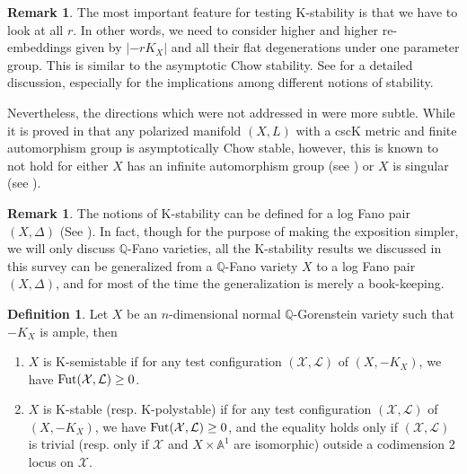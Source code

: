 \documentclass[12pt,reqno]{amsart}%
\newcommand{\cX}{{\mathcal{X}}}
\newcommand{\cL}{{\mathcal{L}}}
\theoremstyle{definition}
\newtheorem{defn}[thm]{Definition}
\newtheorem{rem}[thm]{Remark}
\theoremstyle{remark}
\newcommand{\Fut}{{\rm Fut}}
\newcommand{\bQ}{{\mathbb{Q}}}
\begin{document}
\begin{rem}\label{r-GITvsK}
The most important feature for testing K-stability is that we have to look at all  $r$. In other words, we need to consider higher and higher re-embeddings given by $|-rK_X|$ and all their flat degenerations under  one parameter group.   This is similar to the asymptotic Chow stability. See \cite[Section 3]{RT07} for a detailed discussion, especially for the implications among different notions of stability. 

Nevertheless, the directions which were not addressed in \cite{RT07} were more subtle. While it is proved in \cite{Don02} that any polarized manifold $(X,L)$ with a cscK metric and finite automorphism group is asymptotically Chow stable, however, this is known to not hold for either $X$ has an infinite automorphism group (see \cite{OSY12}) or $X$ is singular (see \cite{Oda12}). 
\end{rem} 

\begin{rem}The notions of K-stability can be defined for a log Fano pair $(X,\Delta)$ (See \cite[(30)]{Don12}). In fact, though for the purpose of making the exposition simpler, we will only discuss $\bQ$-Fano varieties, all the K-stability results we discussed in this survey can be generalized from a $\bQ$-Fano variety $X$ to a log Fano pair $(X,\Delta)$, and for most of the time the generalization is merely a book-keeping. %
\end{rem}



\begin{defn}\label{d-kstable}
Let $X$ be an $n$-dimensional normal $\mathbb{Q}$-Gorenstein variety such that $-K_X$ is ample, then
\begin{enumerate}
\item
$X$ is K-semistable if for any test
configuration $(\cX, \cL)$ of $(X, -K_X)$, we
have $\Fut(\cX, \cL)\ge0$.
\item
$X$ is  K-stable (resp. K-polystable) if for any test configuration $(\cX, \cL)$ of $(X,
-K_X)$, we have $\Fut(\cX, \cL)\ge 0$, and
the equality holds only if $(\cX, \cL)$ is trivial (resp. only if
$\cX$ and $X\times \mathbb{A}^1$ are isomorphic) outside a codimension 2 locus on $\cX$.
\end{enumerate}
\end{defn}
\end{document}
